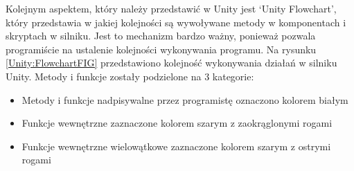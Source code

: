 \documentclass[12pt,twoside]{article}
\begin{document}
Kolejnym aspektem, który należy przedstawić w Unity jest ‘Unity Flowchart’,
który przedstawia w jakiej kolejności są wywoływane metody w komponentach i
skryptach w silniku. Jest to mechanizm bardzo ważny, ponieważ pozwala
programiście na ustalenie kolejności wykonywania programu. Na rysunku
\ref{Unity:FlowchartFIG} przedstawiono kolejność wykonywania działań w silniku
Unity. Metody i funkcje zostały podzielone na 3 kategorie:

\begin{itemize}
    \item Metody i funkcje nadpisywalne przez programistę oznaczono kolorem białym
    \item Funkcje wewnętrzne zaznaczone kolorem szarym z zaokrąglonymi rogami
    \item Funkcje wewnętrzne wielowątkowe zaznaczone kolorem szarym z ostrymi
    rogami
\end{itemize}
\end{document}
